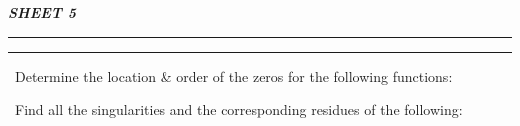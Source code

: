 \documentclass[12pt]{exam}
\begin{document}
\begin{center}
    \bfseries\itshape\Huge
    SHEET 5
\end{center}
\hrule\vspace{0.2em}\hrule
\vspace{1em}

\begin{questions}
\large
\question\ Determine the location \& order of the zeros for the following functions:

\question\ Find all the singularities and the corresponding residues of the following:
\end{questions}
\end{document}
